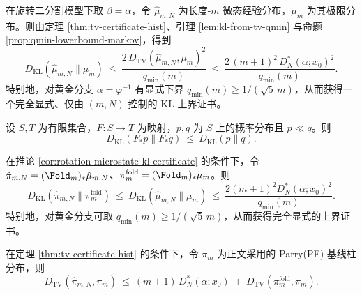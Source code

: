 \begin{corollary}[旋转微态的 KL 证书（显式）]\label{cor:rotation-microstate-kl-certificate}
在旋转二分割模型下取 \(\beta=\alpha\)，令 \(\hat\mu_{m,N}\) 为长度-\(m\) 微态经验分布，\(\mu_m\) 为其极限分布。则由定理 \ref{thm:tv-certificate-hist}、引理 \ref{lem:kl-from-tv-qmin} 与命题 \ref{prop:qmin-lowerbound-markov}，得到
\[
D_{\mathrm{KL}}(\hat\mu_{m,N}\|\mu_m)
\ \le\ \frac{2\,D_{\mathrm{TV}}(\hat\mu_{m,N},\mu_m)^2}{q_{\min}(m)}
\ \le\ \frac{2\,(m+1)^2\,D_N^*(\alpha;x_0)^2}{q_{\min}(m)}.
\]
特别地，对黄金分支 \(\alpha=\varphi^{-1}\) 有显式下界 \(q_{\min}(m)\ge 1/(\sqrt5\,m)\)，从而获得一个完全显式、仅由 \((m,N)\) 控制的 KL 上界证书。
\end{corollary}



\begin{lemma}\label{lem:kl-monotone-pushforward}
设 $S,T$ 为有限集合，$F:S\to T$ 为映射，$p,q$ 为 $S$ 上的概率分布且 $p\ll q$。则
\[
D_{\mathrm{KL}}(F_*p\|F_*q)\ \le\ D_{\mathrm{KL}}(p\|q).
\]
\end{lemma}

\begin{corollary}[折叠后稳定类型的 KL 证书]\label{cor:rotation-folded-kl-certificate}
在推论 \ref{cor:rotation-microstate-kl-certificate} 的条件下，令 $\hat\pi_{m,N}=(\Fold_m)_*\hat\mu_{m,N}$、$\pi_m^{\mathrm{fold}}=(\Fold_m)_*\mu_m$。则
\[
D_{\mathrm{KL}}(\hat\pi_{m,N}\|\pi_m^{\mathrm{fold}})\ \le\ D_{\mathrm{KL}}(\hat\mu_{m,N}\|\mu_m)\ \le\ \frac{2(m+1)^2D_N^*(\alpha;x_0)^2}{q_{\min}(m)}.
\]
特别地，对黄金分支可取 $q_{\min}(m)\ge 1/(\sqrt5\,m)$，从而获得完全显式的上界证书。
\end{corollary}



\begin{corollary}\label{cor:tv-decomposition-parry}
在定理 \ref{thm:tv-certificate-hist} 的条件下，令 $\pi_m$ 为正文采用的 Parry(PF) 基线柱分布，则
\[
D_{\mathrm{TV}}(\hat{\pi}_{m,N},\pi_m)
\ \le\
(m+1)\,D_N^*(\alpha;x_0)\ +\ D_{\mathrm{TV}}(\pi_m^{\mathrm{fold}},\pi_m).
\]
\end{corollary}


